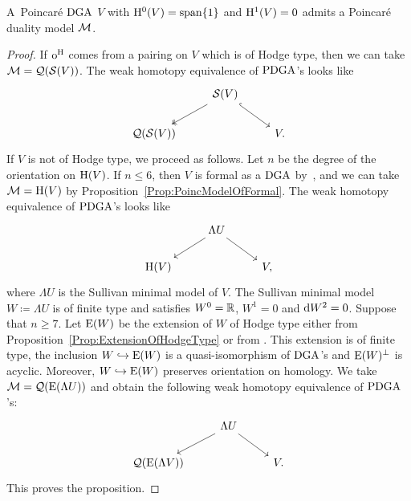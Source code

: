 \documentclass[\MainFolder/Text.tex]{subfiles}
\begin{document}
\begin{Proposition}[Existence of Poincar\'e duality model for $\H^1 = 0$]\label{Prop:ExOfLambrStan}
A~Poincar\'e $\mathrm{DGA}$ $V$ with $\mathrm{H}^0(V) = \mathrm{span}\{1\}$ and $\mathrm{H}^1(V)=0$ admits a Poincar\'e duality model $\mathcal{M}$.
\end{Proposition}
\begin{proof}
If $\mathrm{o}^{\mathrm{H}}$ comes from a pairing on $V$ which is of Hodge type, then we can take $\mathcal{M}=\mathcal{Q}(\mathcal{S}(V))$. The weak homotopy equivalence of $\mathrm{PDGA}$'s looks like
\begin{equation}\label{Eq:ModOne}
\begin{tikzcd}
 &  \VansSmall(V) \arrow[two heads]{dl}\arrow[hook]{dr} & \\
 \VansQuotient(\VansSmall(V)) & & V.
\end{tikzcd}
\end{equation}
If $V$ is not of Hodge type, we proceed as follows. Let $n$ be the degree of the orientation on $\mathrm{H}(V)$.
If $n\le 6$, then $V$ is formal as a $\mathrm{DGA}$ by~\cite{Miller1979}, and we can take $\mathcal{M}=\mathrm{H}(V)$ by Proposition~\ref{Prop:PoincModelOfFormal}.
The weak homotopy equivalence of $\mathrm{PDGA}$'s looks like
\begin{equation}\label{Eq:ModTwo}
\begin{tikzcd}
 & \Lambda U \arrow{dl}\arrow{dr} & \\
 \H(V) & & V,
\end{tikzcd}
\end{equation}
where $\Lambda U$ is the Sullivan minimal model of $V$.
The Sullivan minimal model $W\coloneqq \Lambda U$ is of finite type and satisfies $W^0 = \mathbb{R}$, $W^1 = 0$ and $\mathrm{d} W^2 = 0$.
Suppose that $n\ge 7$.
Let $\mathrm{E}(W)$ be the extension of $W$ of Hodge type either from Proposition~\ref{Prop:ExtensionOfHodgeType} or from \cite[Section~4]{Lambrechts2007}.
This extension is of finite type, the inclusion $W\hookrightarrow\mathrm{E}(W)$ is a quasi-isomorphism of $\mathrm{DGA}$'s and $\mathrm{E}(W)^\perp$ is acyclic.
Moreover, $W\hookrightarrow\mathrm{E}(W)$ preserves orientation on homology.
We take $\mathcal{M} = \mathcal{Q}(\mathrm{E}(\Lambda U))$ and obtain the following weak homotopy equivalence of $\mathrm{PDGA}$'s:
\begin{equation}\label{Eq:ModThree}\begin{tikzcd}
 & \Lambda U \arrow{dl}\arrow{dr} & \\
\VansQuotient(\LambrechtsExtension(\Lambda V))& & V.
\end{tikzcd}\end{equation}
This proves the proposition.
\end{proof}
\end{document}
